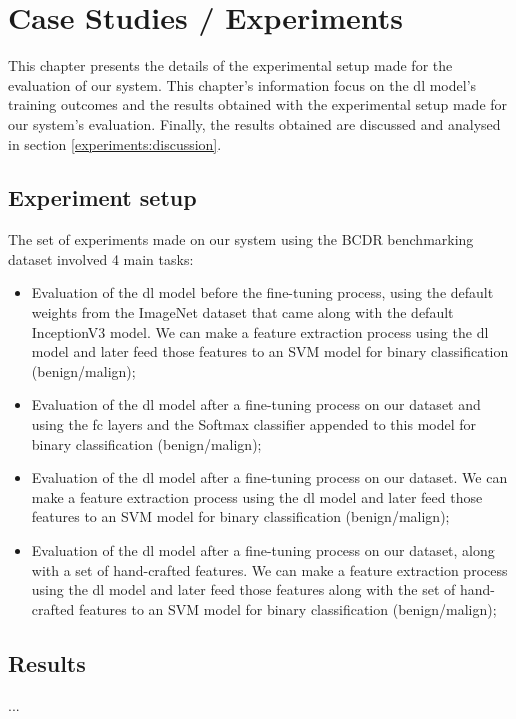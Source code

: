 \documentclass[
  twoside,
  11pt, a4paper,
  footinclude=true,
  headinclude=true,
  cleardoublepage=empty
]{scrbook}
\begin{document}
  \chapter{Case Studies / Experiments} \label{experiments}
    This chapter presents the details of the experimental setup made for the evaluation of our system. This chapter's information focus on the \gls{dl} model's training outcomes and the results obtained with the experimental setup made for our system's evaluation. Finally, the results obtained are discussed and analysed in section \ref{experiments:discussion}.

    \section{Experiment setup} \label{experiments:tests}
      The set of experiments made on our system using the BCDR benchmarking dataset involved 4 main tasks:

      \begin{itemize}
        \item Evaluation of the \gls{dl} model before the fine-tuning process, using the default weights from the ImageNet dataset that came along with the default InceptionV3 model. We can make a feature extraction process using the \gls{dl} model and later feed those features to an SVM model for binary classification (benign/malign);
        \item Evaluation of the \gls{dl} model after a fine-tuning process on our dataset and using the \gls{fc} layers and the Softmax classifier appended to this model for binary classification (benign/malign);
        \item Evaluation of the \gls{dl} model after a fine-tuning process on our dataset. We can make a feature extraction process using the \gls{dl} model and later feed those features to an SVM model for binary classification (benign/malign);
        \item Evaluation of the \gls{dl} model after a fine-tuning process on our dataset, along with a set of hand-crafted features. We can make a feature extraction process using the \gls{dl} model and later feed those features along with the set of hand-crafted features to an SVM model for binary classification (benign/malign);
      \end{itemize}



    \section{Results} \label{experiments:results}
      ...
\end{document}
